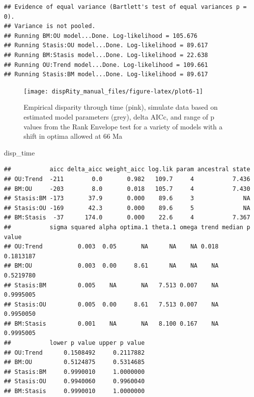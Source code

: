 \documentclass[]{book}
\newenvironment{Shaded}{\begin{snugshade}}{\end{snugshade}}
\newcommand{\NormalTok}[1]{#1}
\begin{document}
\begin{verbatim}
## Evidence of equal variance (Bartlett's test of equal variances p = 0).
## Variance is not pooled.
## Running BM:OU model...Done. Log-likelihood = 105.676
## Running Stasis:OU model...Done. Log-likelihood = 89.617
## Running BM:Stasis model...Done. Log-likelihood = 22.638
## Running OU:Trend model...Done. Log-likelihood = 109.661
## Running Stasis:BM model...Done. Log-likelihood = 89.617
\end{verbatim}

\begin{figure}

{\centering \texttt{[image: dispRity\_manual\_files/figure-latex/plot6-1]} 

}

\caption{Empirical disparity through time (pink), simulate data based on estimated model parameters (grey), delta AICc, and range of p values from the Rank Envelope test for a variety of models with a shift in optima allowed at 66 Ma}\label{fig:plot6}
\end{figure}

\begin{Shaded}
\begin{Highlighting}[]
\NormalTok{disp_time}
\end{Highlighting}
\end{Shaded}

\begin{verbatim}
##           aicc delta_aicc weight_aicc log.lik param ancestral state
## OU:Trend  -211        0.0       0.982   109.7     4           7.436
## BM:OU     -203        8.0       0.018   105.7     4           7.430
## Stasis:BM -173       37.9       0.000    89.6     3              NA
## Stasis:OU -169       42.3       0.000    89.6     5              NA
## BM:Stasis  -37      174.0       0.000    22.6     4           7.367
##           sigma squared alpha optima.1 theta.1 omega trend median p value
## OU:Trend          0.003  0.05       NA      NA    NA 0.018      0.1813187
## BM:OU             0.003  0.00     8.61      NA    NA    NA      0.5219780
## Stasis:BM         0.005    NA       NA   7.513 0.007    NA      0.9995005
## Stasis:OU         0.005  0.00     8.61   7.513 0.007    NA      0.9950050
## BM:Stasis         0.001    NA       NA   8.100 0.167    NA      0.9995005
##           lower p value upper p value
## OU:Trend      0.1508492     0.2117882
## BM:OU         0.5124875     0.5314685
## Stasis:BM     0.9990010     1.0000000
## Stasis:OU     0.9940060     0.9960040
## BM:Stasis     0.9990010     1.0000000
\end{verbatim}
\end{document}
